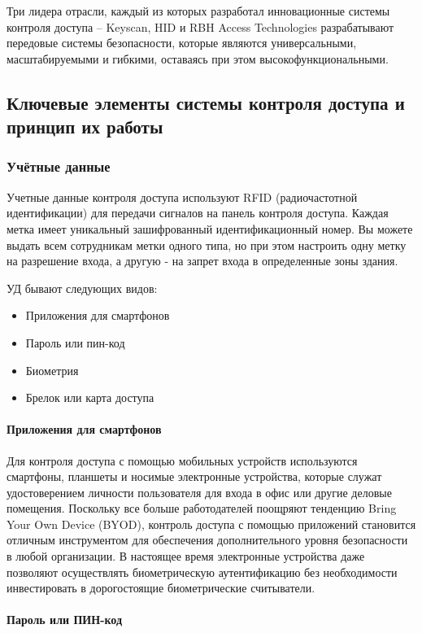 Три лидера отрасли, каждый из которых разработал инновационные системы контроля доступа -- Keyscan, HID и RBH Access Technologies разрабатывают передовые системы безопасности, которые являются универсальными, масштабируемыми и гибкими, оставаясь при этом высокофункциональными.

\subsection{Ключевые элементы системы контроля доступа и принцип их работы}
\subsubsection{Учётные данные}

Учетные данные контроля доступа используют RFID (радиочастотной идентификации) для передачи сигналов на панель контроля доступа. Каждая метка имеет уникальный зашифрованный идентификационный номер. Вы можете выдать всем сотрудникам метки одного типа, но при этом настроить одну метку на разрешение входа, а другую - на запрет входа в определенные зоны здания.

УД бывают следующих видов:

\begin{itemize}
	\item Приложения для смартфонов
	\item Пароль или пин-код
	\item Биометрия
	\item Брелок или карта доступа
\end{itemize}

\paragraph{Приложения для смартфонов}

Для контроля доступа с помощью мобильных устройств используются смартфоны, планшеты и носимые электронные устройства, которые служат удостоверением личности пользователя для входа в офис или другие деловые помещения. Поскольку все больше работодателей поощряют тенденцию Bring Your Own Device (BYOD), контроль доступа с помощью приложений становится отличным инструментом для обеспечения дополнительного уровня безопасности в любой организации. В настоящее время электронные устройства даже позволяют осуществлять биометрическую аутентификацию без необходимости инвестировать в дорогостоящие биометрические считыватели.

\paragraph{Пароль или ПИН-код}


